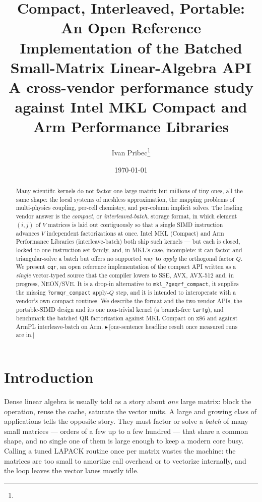 \documentclass[11pt]{article}
\title{\textbf{Compact, Interleaved, Portable:\\ An Open Reference Implementation of the
Batched Small-Matrix Linear-Algebra API}\\[0.3em]
\large A cross-vendor performance study against Intel MKL Compact and Arm Performance Libraries}
\author{Ivan Pribec\thanks{\draftnote{confirm author list, affiliation, e-mail, ORCID; add co-authors and acknowledgements.}}}
\date{\today\quad\draftnote{preprint draft --- not for circulation}}
\newif\ifdraftmode \draftmodetrue
\newcommand{\draftnote}[1]{\ifdraftmode{\textcolor{orange!85!black}{\small$\blacktriangleright$\,\textsf{[#1]}}}\fi}
\newcommand{\code}[1]{\texttt{#1}}
\newcommand{\cqr}{\mbox{\texttt{cqr}}}
\begin{document}
\maketitle

\begin{abstract}
Many scientific kernels do not factor one large matrix but millions of tiny
ones, all the same shape: the local systems of meshless approximation, the
mapping problems of multi-physics coupling, per-cell chemistry, and per-column
implicit solves. The leading vendor answer is the \emph{compact}, or
\emph{interleaved-batch}, storage format, in which element $(i,j)$ of $V$
matrices is laid out contiguously so that a single SIMD instruction advances $V$
independent factorizations at once. Intel MKL (Compact) and Arm Performance
Libraries (interleave-batch) both ship such kernels --- but each is closed,
locked to one instruction-set family, and, in MKL's case, incomplete: it can
factor and triangular-solve a batch but offers no supported way to \emph{apply}
the orthogonal factor $Q$. We present \cqr{}, an open reference implementation of
the compact API written as a \emph{single} vector-typed source that the compiler
lowers to SSE, AVX, AVX-512 and, in progress, NEON/SVE. It is a drop-in
alternative to \code{mkl\_?geqrf\_compact}, it supplies the missing
\code{?ormqr\_compact} apply-$Q$ step, and it is intended to interoperate with a
vendor's own compact routines. We describe the format and the two vendor APIs,
the portable-SIMD design and its one non-trivial kernel (a branch-free
\code{larfg}), and benchmark the batched QR factorization against MKL Compact on
x86 and against ArmPL interleave-batch on Arm.
\draftnote{one-sentence headline result once measured runs are in.}
\end{abstract}

\section{Introduction}
\label{sec:intro}

Dense linear algebra is usually told as a story about \emph{one} large matrix:
block the operation, reuse the cache, saturate the vector units. A large and
growing class of applications tells the opposite story. They must factor or
solve a \emph{batch} of many small matrices --- orders of a few up to a few
hundred --- that share a common shape, and no single one of them is large enough
to keep a modern core busy. Calling a tuned LAPACK routine once per matrix wastes
the machine: the matrices are too small to amortize call overhead or to
vectorize internally, and the loop leaves the vector lanes mostly idle.
\end{document}

